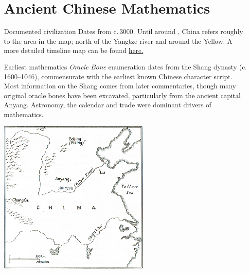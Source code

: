 \graphicspath{{5china/pics/}}

\section{Ancient Chinese Mathematics}

\begin{description}\itemsep2pt
\begin{minipage}[t]{0.62\linewidth}\vspace{-10pt}
  \item[Documented civilization] Dates from c.\,3000\BC. Until around , China refers roughly to the area in the map; north of the Yangtze river and around the Yellow. A more detailed timeline map can be found \href{https://timemaps.com/history/china-200bc/}{here.}\vspace{2pt}
  
  \item[Earliest mathematics] \emph{Oracle Bone} enumeration dates from the Shang dynasty (c.\,1600--1046\BC), commensurate with the earliest known Chinese character script. Most information on the Shang comes from later commentaries, though many original oracle bones have been excavated, particularly from the ancient capital Anyang. Astronomy, the calendar and trade were dominant drivers of mathematics.
\end{minipage}\hfill\begin{minipage}[t]{0.37\linewidth}\vspace{-20pt}
\flushright\includegraphics[scale=0.73]{AncientChina-small.png}
\end{minipage}


\end{description}
